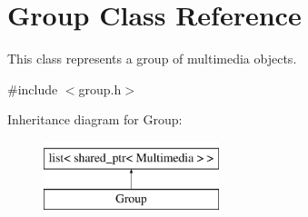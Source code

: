 \hypertarget{class_group}{\section{Group Class Reference}
\label{class_group}
}


This class represents a group of multimedia objects.  




{\ttfamily \#include $<$group.\-h$>$}

Inheritance diagram for Group\-:\begin{figure}[H]
\begin{center}
\leavevmode
\includegraphics[height=2.000000cm]{class_group}
\end{center}
\end{figure}
